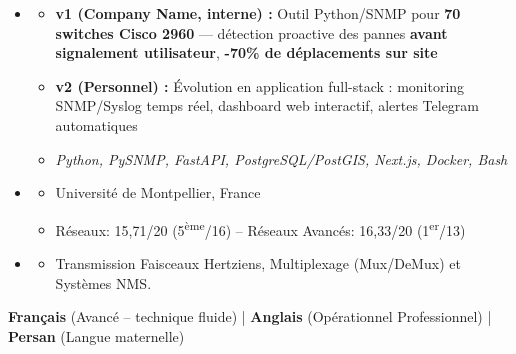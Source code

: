 \documentclass[11pt,a4paper]{article}
\renewcommand{\itemspace}{\vspace{0.15em}}
\begin{document}
\begin{itemize}[leftmargin=1em, label={}]
    \item
    \begin{itemize}[leftmargin=1.5em, label=$\circ$, nosep]
        \item \textbf{v1 (Company Name, interne) :} Outil Python/SNMP pour \textbf{70 switches Cisco 2960} — détection proactive des pannes \textbf{avant signalement utilisateur}, \textbf{-70\% de déplacements sur site}
        \item \textbf{v2 (Personnel) :} Évolution en application full-stack : monitoring SNMP/Syslog temps réel, dashboard web interactif, alertes Telegram automatiques
        \item \emph{Python, PySNMP, FastAPI, PostgreSQL/PostGIS, Next.js, Docker, Bash}
    \end{itemize}
\end{itemize}

\begin{itemize}[leftmargin=1em, label={}]
    \item
    \begin{itemize}[leftmargin=1.5em, label=$\circ$, nosep]
        \item Université de Montpellier, France
        \item Réseaux: 15,71/20 (5\textsuperscript{ème}/16) -- Réseaux Avancés: 16,33/20 (1\textsuperscript{er}/13)
    \end{itemize}
    \itemspace
    \item
    \begin{itemize}[leftmargin=1.5em, label=$\circ$, nosep]
        \item Transmission Faisceaux Hertziens, Multiplexage (Mux/DeMux) et Systèmes NMS.
    \end{itemize}
\end{itemize}

\noindent
\textbf{Français} (Avancé -- technique fluide) | \textbf{Anglais} (Opérationnel Professionnel) | \textbf{Persan} (Langue maternelle)
\end{document}
